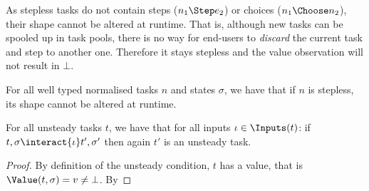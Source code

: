 As stepless tasks do not contain steps ($n_1 \Step e_2$) or choices ($n_1 \Choose n_2$),
their shape cannot be altered at runtime.
That is, although new tasks can be spooled up in task pools,
there is no way for end-users to \emph{discard} the current task
and step to another one.
Therefore it stays stepless and the value observation will not result in $\bot$.

\begin{corollary}
  \label{cor:stepless-stays-stepless}
  For all well typed normalised tasks $n$ and states $\sigma$,
  we have that
    if $n$ is stepless,
    its shape cannot be altered at runtime.
\end{corollary}

\begin{proposition}
  For all unsteady tasks $t$,
  we have that for all inputs $\iota \in \Inputs(t)$:
    if $t,\sigma \interact{\iota} t',\sigma'$
    then again $t'$ is an unsteady task.
\end{proposition}
\begin{proof}
  By definition of the unsteady condition, $t$ has a value,
  that is $\Value(t,\sigma) = v \neq \bot$.
  By
\end{proof}
